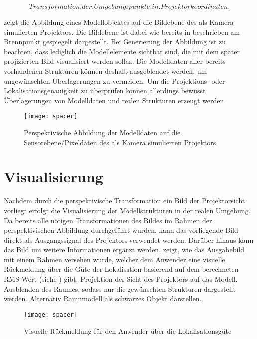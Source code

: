 \begin{equation}
Transformation. der. Umgebungspunkte. in. Projektorkoordinaten.
\end{equation} 

 zeigt die Abbildung eines Modellobjektes auf die Bildebene des als Kamera simulierten Projektors. Die Bildebene ist dabei wie bereits in  beschrieben am Brennpunkt gespiegelt dargestellt. Bei Generierung der Abbildung ist zu beachten, dass lediglich die Modellelemente sichtbar sind, die mit dem später projizierten Bild visualisiert werden sollen. Die Modelldaten aller bereits vorhandenen Strukturen können deshalb ausgeblendet werden, um ungewünschten Überlagerungen zu vermeiden. Um die Projektions- oder Lokalisationsgenauigkeit zu überprüfen können allerdings bewusst Überlagerungen von Modelldaten und realen Strukturen erzeugt werden.

\begin{figure}[!ht]
	\begin{center}
		\texttt{[image: spacer]}
		\caption{Perspektivische Abbildung der Modelldaten auf die Sensorebene/Pixeldaten des als Kamera simulierten Projektors}
		\label{fig.perspproj_vtk}
	\end{center}
\end{figure}


\section{Visualisierung}
Nachdem durch die perspektivische Transformation ein Bild der Projektorsicht vorliegt erfolgt die Visualisierung der Modellstrukturen in der realen Umgebung. Da bereits alle nötigen Transformationen des Bildes im Rahmen der perspektivischen Abbildung durchgeführt wurden, kann das vorliegende Bild direkt als Ausgangssignal des Projektors verwendet werden. Darüber hinaus kann das Bild um weitere Informationen ergänzt werden.  zeigt, wie das Ausgabebild mit einem Rahmen versehen wurde, welcher dem Anwender eine visuelle Rückmeldung über die Güte der Lokalisation basierend auf dem berechneten RMS Wert (siehe ) gibt.
Projektion der Sicht des Projektors auf das Modell. Ausblenden des Raumes, sodass nur die gewünschten Strukturen dargestellt werden. Alternativ Raummodell als schwarzes Objekt darstellen.

\begin{figure}[!ht]
	\begin{center}
		\texttt{[image: spacer]}
		\caption{Visuelle Rückmeldung für den Anwender über die Lokalisationsgüte}
		\label{fig.proj_rms}
	\end{center}
\end{figure}